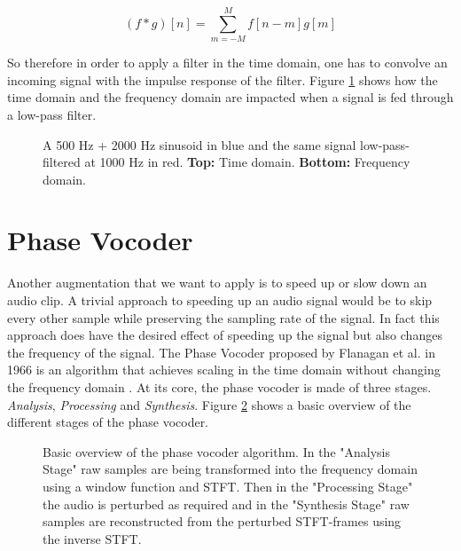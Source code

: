 \begin{equation}\label{eq:convolution}
    (f * g)[n] = \sum_{m=-M}^M f[n-m]g[m]
\end{equation}

So therefore in order to apply a filter in the time domain, one has to convolve an incoming signal with the impulse response of the filter. Figure \ref{fig:lp_effect} shows how the time domain and the frequency domain are impacted when a signal is fed through a low-pass filter.

\begin{figure}[htbp]
    \centering
    
    \caption[Filter demonstration]{A 500 Hz + 2000 Hz sinusoid in blue and the same signal low-pass-filtered at 1000 Hz in red. \textbf{Top:} Time domain. \textbf{Bottom:} Frequency domain.}
    \label{fig:lp_effect}
\end{figure}

\newpage

\section{Phase Vocoder}\label{sec:phase_vocoder}

Another augmentation that we want to apply is to speed up or slow down an audio clip. A trivial approach to speeding up an audio signal would be to skip every other sample while preserving the sampling rate of the signal. In fact this approach does have the desired effect of speeding up the signal but also changes the frequency of the signal. The Phase Vocoder proposed by Flanagan et al. in 1966 \cite{flanagan1966phasevocoder} is an algorithm that achieves scaling in the time domain without changing the frequency domain \cite{portnoff20005timescale}. At its core, the phase vocoder is made of three stages. \textit{Analysis}, \textit{Processing} and \textit{Synthesis}. Figure \ref{fig:phase_vocoder} shows a basic overview of the different stages of the phase vocoder.

\begin{figure}[h!]
    \centering
    
    \caption[Phase Vocoder Overview]{Basic overview of the phase vocoder algorithm. In the "Analysis Stage" raw samples are being transformed into the frequency domain using a window function and STFT. Then in the "Processing Stage" the audio is perturbed as required and in the "Synthesis Stage" raw samples are reconstructed from the perturbed STFT-frames using the inverse STFT.}
    \label{fig:phase_vocoder}
\end{figure}


